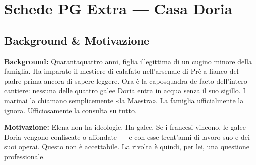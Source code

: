 %

\chapter{Schede PG Extra --- Casa Doria}



\section*{Background \& Motivazione}

\begin{rulebox}{}
  \textbf{Background:} Quarantaquattro anni, figlia illegittima di un cugino
  minore della famiglia. Ha imparato il mestiere di calafato nell'arsenale di Prè
  a fianco del padre prima ancora di sapere leggere. Ora è la caposquadra
  de facto dell'intero cantiere: nessuna delle quattro galee Doria entra in acqua
  senza il suo sigillo. I marinai la chiamano semplicemente «la Maestra».
  La famiglia ufficialmente la ignora. Ufficiosa­mente la consulta su tutto.

  \medskip\noindent\textcolor{DoriaBlue}{\textbf{Motivazione:}} Elena non ha
  ideologie. Ha galee. Se i francesi vincono, le galee Doria vengono confiscate
  o affondate — e con esse trent'anni di lavoro suo e dei suoi operai. Questo
  non è accettabile. La rivolta è quindi, per lei, una questione professionale.
\end{rulebox}

